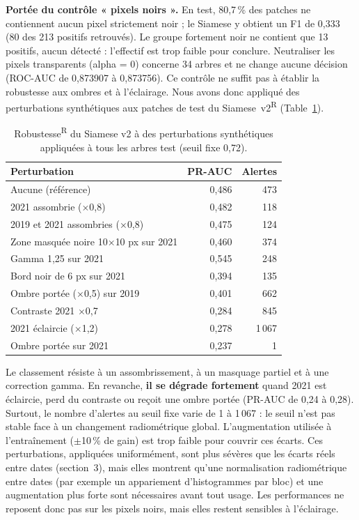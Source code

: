 \documentclass[10pt,a4paper,twocolumn]{article}
\newcommand{\retro}{\textcolor{retro}{\textsuperscript{\textsf{R}}}}
\begin{document}
\textbf{Portée du contrôle « pixels noirs ».} En test, 80,7\,\% des patches ne contiennent aucun pixel strictement noir ; le
Siamese y obtient un F1 de 0,333 (80 des 213 positifs retrouvés). Le groupe fortement noir ne contient que 13 positifs, aucun
détecté : l'effectif est trop faible pour conclure. Neutraliser les pixels transparents (alpha = 0) concerne 34 arbres et ne
change aucune décision (ROC-AUC de 0,873907 à 0,873756). Ce contrôle ne suffit pas à établir la robustesse aux ombres et à
l'éclairage.\label{sec:robust} Nous avons donc appliqué des perturbations synthétiques aux patches de test du Siamese~v2\retro{}
(Table~\ref{tab:robust}).

\begin{table}[t]
\centering\small
\caption{Robustesse\retro{} du Siamese v2 à des perturbations synthétiques appliquées à tous les arbres test (seuil fixe 0,72).}
\label{tab:robust}
\setlength{\tabcolsep}{3pt}
\begin{tabular}{@{}lrr@{}}
\toprule
Perturbation & PR-AUC & Alertes \\
\midrule
Aucune (référence) & 0,486 & 473 \\
2021 assombrie ($\times$0,8) & 0,482 & 118 \\
2019 et 2021 assombries ($\times$0,8) & 0,475 & 124 \\
Zone masquée noire 10$\times$10 px sur 2021 & 0,460 & 374 \\
Gamma 1,25 sur 2021 & 0,545 & 248 \\
Bord noir de 6 px sur 2021 & 0,394 & 135 \\
Ombre portée ($\times$0,5) sur 2019 & 0,401 & 662 \\
Contraste 2021 $\times$0,7 & 0,284 & 845 \\
2021 éclaircie ($\times$1,2) & 0,278 & 1\,067 \\
Ombre portée sur 2021 & 0,237 & 1 \\
\bottomrule
\end{tabular}
\end{table}

Le classement résiste à un assombrissement, à un masquage partiel et à une correction gamma. En revanche, \textbf{il se dégrade
fortement} quand 2021 est éclaircie, perd du contraste ou reçoit une ombre portée (PR-AUC de 0,24 à 0,28). Surtout, le nombre
d'alertes au seuil fixe varie de 1 à 1\,067 : le seuil n'est pas stable face à un changement radiométrique global.
L'augmentation utilisée à l'entraînement ($\pm$10\,\% de gain) est trop faible pour couvrir ces écarts. Ces perturbations,
appliquées uniformément, sont plus sévères que les écarts réels entre dates (section~3), mais elles montrent qu'une
normalisation radiométrique entre dates (par exemple un appariement d'histogrammes par bloc) et une augmentation plus forte
sont nécessaires avant tout usage. Les performances ne reposent donc pas sur les pixels noirs, mais elles restent sensibles à
l'éclairage.
\end{document}
